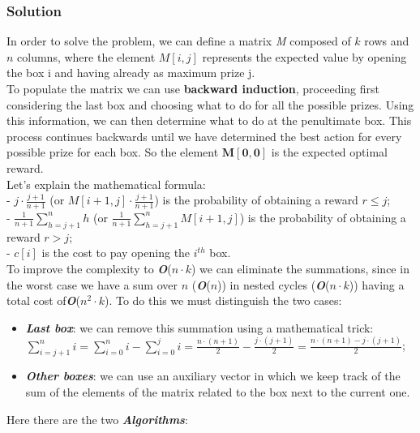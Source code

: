\documentclass[11pt]{article}
\begin{document}
\subsubsection*{Solution}
In order to solve the problem, we can define a matrix \textit{M} composed of $k$ rows and $n$ columns, where the element $M[i, j]$ represents the expected value by opening the box i and having already as maximum prize j. \\
To populate the matrix we can use \textbf{backward induction}, proceeding first considering the last box and choosing what to do for all the possible prizes. Using this information, we can then determine what to do at the penultimate box. This process continues backwards until we have determined the best action for every possible prize for each box. So the element $\mathbf{M[0, 0]}$ is the expected optimal reward.\\
Let's explain the mathematical formula: \\
- $j \cdot \frac{j+1}{n+1}$ (or $M[i+1, j] \cdot \frac{j+1}{n+1}$) is the probability of obtaining a reward $r \le j$; \\
- $\frac{1}{n+1}\sum\limits_{h = j + 1}^n{h}$ (or $\frac{1}{n+1}\sum\limits_{h = j + 1}^n{M[i+1, j]}$) is the probability of obtaining a reward $r > j$; \\
- $c[i]$ is the cost to pay opening the $i^{th}$ box. \\
To improve the complexity to \textbf{\textit{O}}($n \cdot k$) we can eliminate the summations, since in the worst case we have a sum over $n$ (\textbf{\textit{O}}($n$)) in nested cycles (\textbf{\textit{O}}($n \cdot k$)) having a total cost of\textbf{\textit{O}}($n^2 \cdot k$). To do this we must distinguish the two cases:
\begin{itemize}
	\item \textbf{\textit{Last box}}: we can remove this summation using a mathematical trick: \\
	$\sum\limits_{i = j + 1}^n{i} = \sum\limits_{i = 0}^n{i} - \sum\limits_{i = 0}^j{i} = \frac{n \cdot (n+1)}{2} - \frac{j \cdot (j+1)}{2} = \frac{n \cdot (n+1) - j \cdot (j+1)}{2}$;
	\item \textbf{\textit{Other boxes}}: we can use an auxiliary vector in which we keep track of the sum of the elements of the matrix related to the box next to the current one.
\end{itemize}

Here there are the two \textbf{\textit{Algorithms}}:
\end{document}
